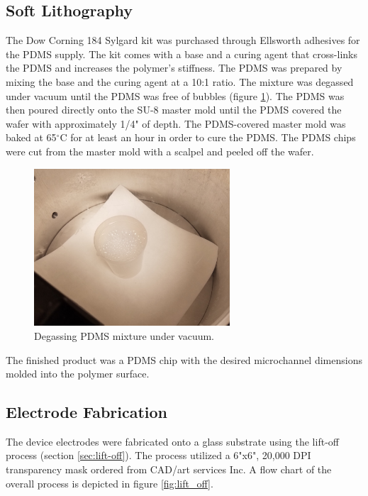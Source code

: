 \FloatBarrier

\subsection*{Soft Lithography}
\par The Dow Corning 184 Sylgard kit was purchased through Ellsworth adhesives for the PDMS supply. The kit comes with a base and a curing agent that cross-links the PDMS and increases the polymer's stiffness. The PDMS was prepared by mixing the base and the curing agent at a 10:1 ratio. The mixture was degassed under vacuum until the PDMS was free of bubbles (figure \ref{fig:pdms_vacuum}). The PDMS was then poured directly onto the SU-8 master mold until the PDMS covered the wafer with approximately 1/4" of depth. The PDMS-covered master mold was baked at 65$^\circ$C for at least an hour in order to cure the PDMS. The PDMS chips were cut from the master mold with a scalpel and peeled off the wafer. 
 


\begin{figure}[h]
    \centering
    \includegraphics[width=0.65\textwidth]{images/pdms_in_vacuum.jpg}
    \caption{Degassing PDMS mixture under vacuum.}
    \label{fig:pdms_vacuum}
\end{figure}


\par The finished product was a PDMS chip with the desired microchannel dimensions molded into the polymer surface.

\subsection{Electrode Fabrication}

\par The device electrodes were fabricated onto a glass substrate using the lift-off process (section \ref{sec:lift-off}). The process utilized a 6"x6", 20,000 DPI transparency mask ordered from CAD/art services Inc. A flow chart of the overall process is depicted in figure \ref{fig:lift_off}.

